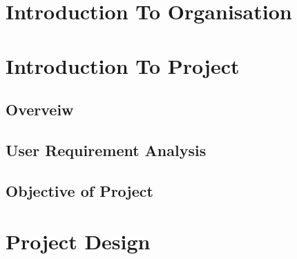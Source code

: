 \documentclass[12pt]{report}
\begin{document}

\begin{screen}
\ppttitle
\end{screen}
\footskip 0.7cm
\thispagestyle{empty} 
\pagetitle
\newpage
{}
\cfoot{\thepage}


\newpage


%

\newpage
\tableofcontents
\newpage
\listoffigures
\newpage
\listoftables
\newpage


\cfoot{\thepage}

\newpage
\chapter{Introduction To Organisation}

\newpage
%
\chapter{Introduction To Project}

\section{Overveiw}



\section{User Requirement Analysis} 




\section{Objective of Project}

\chapter{Project Design}



\end{document}
